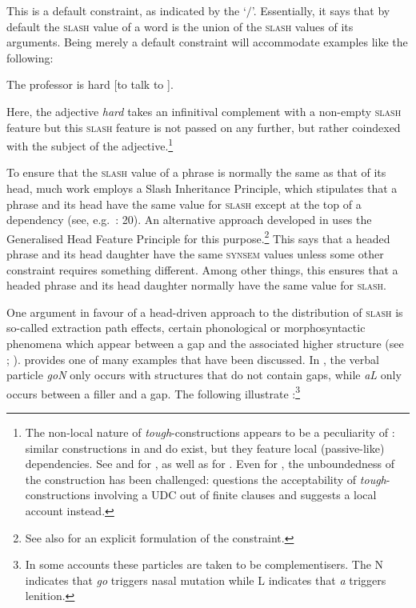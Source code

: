 \documentclass[output=paper
,notxmath 
 	        ,biblatex
                ,babelshorthands
                ,newtxmath
                ,draftmode
                ,colorlinks, citecolor=brown
]{langscibook}
\begin{document}
\noindent
This is a default constraint, as indicated by the `$\slash$'\is{$\slash$}. Essentially,
it says that by default the \textsc{slash} value of a word
is the union of the \textsc{slash} values of its arguments.  Being
merely a
default constraint will accommodate examples like the following:

\begin{exe}
\ex \label{ex:UDC:33}
The professor is hard [to talk to \trace{}].
\end{exe}

\noindent
Here, the adjective \emph{hard} takes an infinitival complement with a
non-empty \textsc{slash} feature 
but this  \textsc{slash} feature
is not passed on any further, but rather coindexed with the subject of
the adjective.\footnote{The
  non-local nature of \textit{tough}-constructions appears to be a
  peculiarity of : similar constructions in  and 
  do exist, but they feature local (passive-like) dependencies. See
  \citet{abeille_a-godard_d-miller_p-sag_i95} and
  \citet{aguila-multner18} for , as well as \citet[Section~3.1.5]{Mueller:02b}
  for . Even for , the unboundedness of the construction
  has been challenged: \citet{Grover:95} questions the acceptability
  of  \textit{tough}-constructions involving a UDC out of
  finite clauses and suggests a local account instead.}

To ensure that the \textsc{slash} value of a phrase is normally the
same as that of its head, much work employs a Slash Inheritance
Principle, which stipulates that a phrase and its head have the same
value for \textsc{slash} except at the top of a dependency (see, e.g.\
\citealt{Bouma:Malouf:Sag:01}: 20). An alternative approach developed
in \citet[Chapter~5.1]{Ginzburg:Sag:01} uses the Generalised Head
Feature Principle for this purpose.\footnote{
  {See also \crossrefchapterw[\pageref{properties:ex-generalized-head-feature-principle}]{properties} for an explicit formulation of the constraint.}
} This says that a headed phrase and
its head daughter have the same \textsc{synsem} values unless some
other constraint requires something different. Among other things,
this ensures that a headed phrase and its head daughter normally have
the same value for \textsc{slash}.

One\label{page-start-extraction-path-effects} argument in favour of a head-driven approach to the distribution
of \textsc{slash} is so-called extraction path effects\is{extraction path effect}, certain phonological or
morphosyntactic phenomena which appear between a gap and the
associated higher structure (see \citealt{hukari.levine:adjunct};
\citealt[Section~3.2]{Bouma:Malouf:Sag:01}).  provides one of many
examples that have been discussed. In \ili{Irish}, the verbal particle
\emph{goN} only occurs with structures that do not contain gaps, while
\emph{aL} only occurs between a filler and a gap. The following 
illustrate \citep[26]{BMS2001a}:\footnote{In some accounts these particles are taken to be
  complementisers. The N indicates that \emph{go} triggers nasal
  mutation while L indicates that \emph{a} triggers lenition.}
\end{document}
